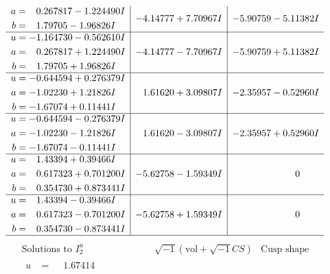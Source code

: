 \documentclass[1p]{elsarticle_modified}
\theoremstyle{definition}
\newcommand{\I}{\sqrt{-1}}
\begin{document}
$$\begin{array}{c|c|c}
\begin{aligned}
a &= \phantom{-}0.267817 - 1.224490 I \\
b &= \phantom{-}1.79705 - 1.96826 I\end{aligned}
 & -4.14777 + 7.70967 I & -5.90759 - 5.11382 I \\ \hline\begin{aligned}
u &= -1.164730 - 0.562610 I \\
a &= \phantom{-}0.267817 + 1.224490 I \\
b &= \phantom{-}1.79705 + 1.96826 I\end{aligned}
 & -4.14777 - 7.70967 I & -5.90759 + 5.11382 I \\ \hline\begin{aligned}
u &= -0.644594 + 0.276379 I \\
a &= -1.02230 + 1.21826 I \\
b &= -1.67074 + 0.11441 I\end{aligned}
 & \phantom{-}1.61620 + 3.09807 I & -2.35957 - 0.52960 I \\ \hline\begin{aligned}
u &= -0.644594 - 0.276379 I \\
a &= -1.02230 - 1.21826 I \\
b &= -1.67074 - 0.11441 I\end{aligned}
 & \phantom{-}1.61620 - 3.09807 I & -2.35957 + 0.52960 I \\ \hline\begin{aligned}
u &= \phantom{-}1.43394 + 0.39466 I \\
a &= \phantom{-}0.617323 + 0.701200 I \\
b &= \phantom{-}0.354730 + 0.873441 I\end{aligned}
 & -5.62758 - 1.59349 I & \phantom{-0.000000 } 0 \\ \hline\begin{aligned}
u &= \phantom{-}1.43394 - 0.39466 I \\
a &= \phantom{-}0.617323 - 0.701200 I \\
b &= \phantom{-}0.354730 - 0.873441 I\end{aligned}
 & -5.62758 + 1.59349 I & \phantom{-0.000000 } 0\\
 \hline 
 \end{array}$$\newpage$$\begin{array}{c|c|c}  
\text{Solutions to }I^u_{2}& \I (\text{vol} + \sqrt{-1}CS) & \text{Cusp shape}\\
 \hline 
\begin{aligned}
u &= \phantom{-}1.67414\phantom{ +0.000000I} \\

\end{aligned}
\end{array}$$
\end{document}
